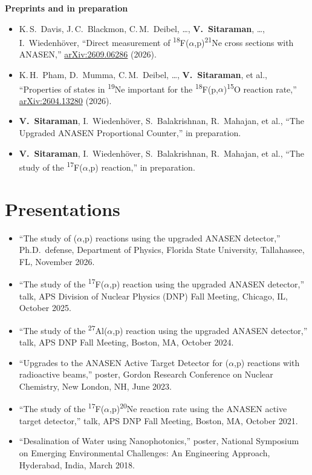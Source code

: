 \documentclass[10pt,letterpaper]{article}
\newcommand{\subhead}[1]{\par\addvspace{3pt}\noindent\textbf{#1}\par\nopagebreak}
\newcommand{\iso}[2]{\textsuperscript{#1}#2}
\newcommand{\ap}{(\ensuremath{\alpha},p)}
\newcommand{\me}{\textbf{V.~Sitaraman}}
\begin{document}
\subhead{Preprints and in preparation}
\begin{itemize}
  \item K.\,S.\ Davis, J.\,C.\ Blackmon, C.\,M.\ Deibel, \ldots, \me, \ldots, I.\ Wiedenhöver, ``Direct measurement of \iso{18}{F}\ap\iso{21}{Ne} cross sections with ANASEN,'' \href{https://arxiv.org/abs/2609.06286}{arXiv:2609.06286} (2026).
  \item K.\,H.\ Pham, D.\ Mumma, C.\,M.\ Deibel, \ldots, \me, et al., ``Properties of states in \iso{19}{Ne} important for the \iso{18}{F}(p,\ensuremath{\alpha})\iso{15}{O} reaction rate,'' \href{https://arxiv.org/abs/2604.13280}{arXiv:2604.13280} (2026).
  \item \me, I.\ Wiedenhöver, S.\ Balakrishnan, R.\ Mahajan, et al., ``The Upgraded ANASEN Proportional Counter,'' in preparation.
  \item \me, I.\ Wiedenhöver, S.\ Balakrishnan, R.\ Mahajan, et al., ``The study of the \iso{17}{F}\ap{} reaction,'' in preparation.
\end{itemize}

\section{Presentations}
\begin{itemize}
  \item ``The study of \ap{} reactions using the upgraded ANASEN detector,'' Ph.D.\ defense, Department of Physics, Florida State University, Tallahassee, FL, November 2026.
  \item ``The study of the \iso{17}{F}\ap{} reaction using the upgraded ANASEN detector,'' talk, APS Division of Nuclear Physics (DNP) Fall Meeting, Chicago, IL, October 2025.
  \item ``The study of the \iso{27}{Al}\ap{} reaction using the upgraded ANASEN detector,'' talk, APS DNP Fall Meeting, Boston, MA, October 2024.
  \item ``Upgrades to the ANASEN Active Target Detector for \ap{} reactions with radioactive beams,'' poster, Gordon Research Conference on Nuclear Chemistry, New London, NH, June 2023.
  \item ``The study of the \iso{17}{F}\ap\iso{20}{Ne} reaction rate using the ANASEN active target detector,'' talk, APS DNP Fall Meeting, Boston, MA, October 2021.
  \item ``Desalination of Water using Nanophotonics,'' poster, National Symposium on Emerging Environmental Challenges: An Engineering Approach, Hyderabad, India, March 2018.
\end{itemize}
\end{document}

